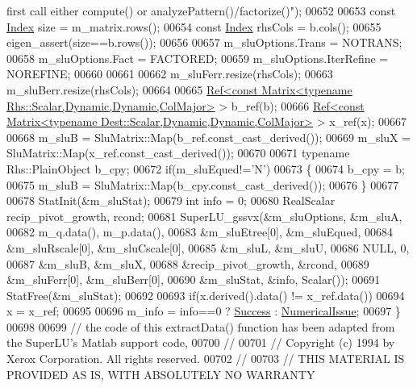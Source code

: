 \begin{DoxyCode}
{       first call either compute() or analyzePattern()/factorize()"});
00652 
00653   \textcolor{keyword}{const} \hyperlink{namespace_eigen_a62e77e0933482dafde8fe197d9a2cfde}{Index} size = m\_matrix.rows();
00654   \textcolor{keyword}{const} \hyperlink{namespace_eigen_a62e77e0933482dafde8fe197d9a2cfde}{Index} rhsCols = b.cols();
00655   eigen\_assert(size==b.rows());
00656 
00657   m\_sluOptions.Trans = NOTRANS;
00658   m\_sluOptions.Fact = FACTORED;
00659   m\_sluOptions.IterRefine = NOREFINE;
00660   
00661 
00662   m\_sluFerr.resize(rhsCols);
00663   m\_sluBerr.resize(rhsCols);
00664   
00665   \hyperlink{group___core___module_class_eigen_1_1_ref}{Ref<const Matrix<typename Rhs::Scalar,Dynamic,Dynamic,ColMajor>}
       > b\_ref(b);
00666   \hyperlink{group___core___module_class_eigen_1_1_ref}{Ref<const Matrix<typename Dest::Scalar,Dynamic,Dynamic,ColMajor>}
       > x\_ref(x);
00667   
00668   m\_sluB = SluMatrix::Map(b\_ref.const\_cast\_derived());
00669   m\_sluX = SluMatrix::Map(x\_ref.const\_cast\_derived());
00670   
00671   \textcolor{keyword}{typename} Rhs::PlainObject b\_cpy;
00672   \textcolor{keywordflow}{if}(m\_sluEqued!=\textcolor{charliteral}{'N'})
00673   \{
00674     b\_cpy = b;
00675     m\_sluB = SluMatrix::Map(b\_cpy.const\_cast\_derived());  
00676   \}
00677 
00678   StatInit(&m\_sluStat);
00679   \textcolor{keywordtype}{int} info = 0;
00680   RealScalar recip\_pivot\_growth, rcond;
00681   SuperLU\_gssvx(&m\_sluOptions, &m\_sluA,
00682                 m\_q.data(), m\_p.data(),
00683                 &m\_sluEtree[0], &m\_sluEqued,
00684                 &m\_sluRscale[0], &m\_sluCscale[0],
00685                 &m\_sluL, &m\_sluU,
00686                 NULL, 0,
00687                 &m\_sluB, &m\_sluX,
00688                 &recip\_pivot\_growth, &rcond,
00689                 &m\_sluFerr[0], &m\_sluBerr[0],
00690                 &m\_sluStat, &info, Scalar());
00691   StatFree(&m\_sluStat);
00692   
00693   \textcolor{keywordflow}{if}(x.derived().data() != x\_ref.data())
00694     x = x\_ref;
00695   
00696   m\_info = info==0 ? \hyperlink{group__enums_gga85fad7b87587764e5cf6b513a9e0ee5ea52581b035f4b59c203b8ff999ef5fcea}{Success} : \hyperlink{group__enums_gga85fad7b87587764e5cf6b513a9e0ee5eaaf9b736d310a664e7729d163a035cc5f}{NumericalIssue};
00697 \}
00698 
00699 \textcolor{comment}{// the code of this extractData() function has been adapted from the SuperLU's Matlab support code,}
00700 \textcolor{comment}{//}
00701 \textcolor{comment}{//  Copyright (c) 1994 by Xerox Corporation.  All rights reserved.}
00702 \textcolor{comment}{//}
00703 \textcolor{comment}{//  THIS MATERIAL IS PROVIDED AS IS, WITH ABSOLUTELY NO WARRANTY}

\end{DoxyCode}
